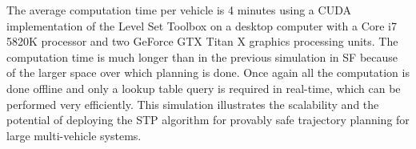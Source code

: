 The average computation time per vehicle is 4 minutes using a CUDA implementation of the Level Set Toolbox on a desktop computer with a Core i7 5820K processor and two GeForce GTX Titan X graphics processing units. The computation time is much longer than in the previous simulation in SF because of the larger space over which planning is done. Once again all the computation is done offline and only a lookup table query is required in real-time, which can be performed very efficiently. This simulation illustrates the scalability and the potential of deploying the STP algorithm for provably safe trajectory planning for large multi-vehicle systems.